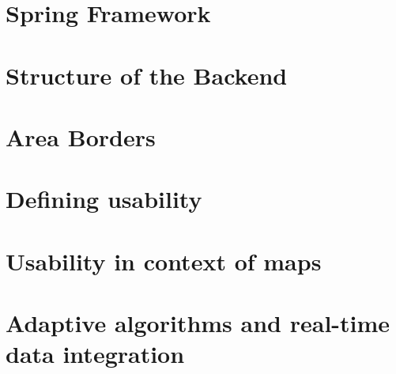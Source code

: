 \section{Spring Framework}


\section{Structure of the Backend}


\section{Area Borders}


\section{Defining usability}


\section{Usability in context of maps}


\section{Adaptive algorithms and real-time data integration}


